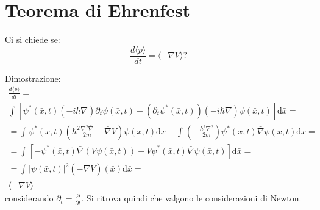\section{Teorema di Ehrenfest} %
Ci si chiede se:
\begin{equation}
\frac{d\langle p\rangle}{dt}=\langle -\bar \nabla V\rangle ?
\end{equation}

Dimostrazione:
\begin{equation}\begin{split}
\frac{d\langle p\rangle}{dt}=\\
\int_{}^{}{\left[\psi ^*\left(\bar x,t\right)\left(-i\hbar \bar \nabla \right)\partial _t\psi\left(\bar x,t\right)+\left(\partial _t\psi ^*\left(\bar x,t\right)\right)\left(-i\hbar \bar \nabla  \right)\psi \left(\bar x,t\right)\right] \textrm{d}\bar x}=\\
=\int_{}^{}{\psi ^*\left(\bar x,t\right)\left(\hbar ^2\frac{\nabla ^2\bar \nabla }{2m}-\bar \nabla V\right)\psi \left(\bar x,t\right) \textrm{d}\bar x}+\int_{}^{}{\left(-\frac{\hbar ^2\nabla ^2}{2m}\right)\psi ^*\left(\bar x,t\right)\bar \nabla \psi \left(\bar x,t\right) \textrm{d}\bar x}=\\
=\int_{}^{}{\left[-\psi ^*\left(\bar x,t\right)\bar \nabla \left(V\psi \left(\bar x,t\right)\right)+V\psi ^*\left(\bar x,t\right)\bar \nabla \psi \left(\bar x,t\right) \right] \textrm{d}\bar x}=\\
=\int_{}^{}{|\psi \left(\bar x,t\right) |^2\left(-\bar \nabla V\right)\left(\bar x\right) \textrm{d}\bar x}=\\
\langle -\bar \nabla V\rangle
\end{split}\end{equation}
considerando $\partial_t=\frac{\partial}{\partial t}$.
Si ritrova quindi che valgono le considerazioni di Newton.